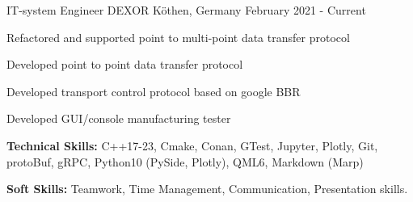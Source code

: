 

\begin{cventries}

  \cventry
    {IT-system Engineer} %
    {DEXOR} %
    {Köthen, Germany} %
    {February 2021 - Current} %
    {
      \begin{cvitems} %
        \item {Refactored and supported point to multi-point data transfer protocol}
        \item {Developed point to point data transfer protocol}
        \item {Developed transport control protocol based on google BBR}
        \item {Developed GUI/console manufacturing tester}
        \item {\textbf{Technical Skills:} C++17-23, Cmake, Conan, GTest, Jupyter, Plotly, Git, protoBuf, gRPC, Python10 (PySide, Plotly), QML6, Markdown (Marp)}
        \item {\textbf{Soft Skills:} Teamwork, Time Management, Communication, Presentation skills.}
      \end{cvitems}
    }


\end{cventries}
